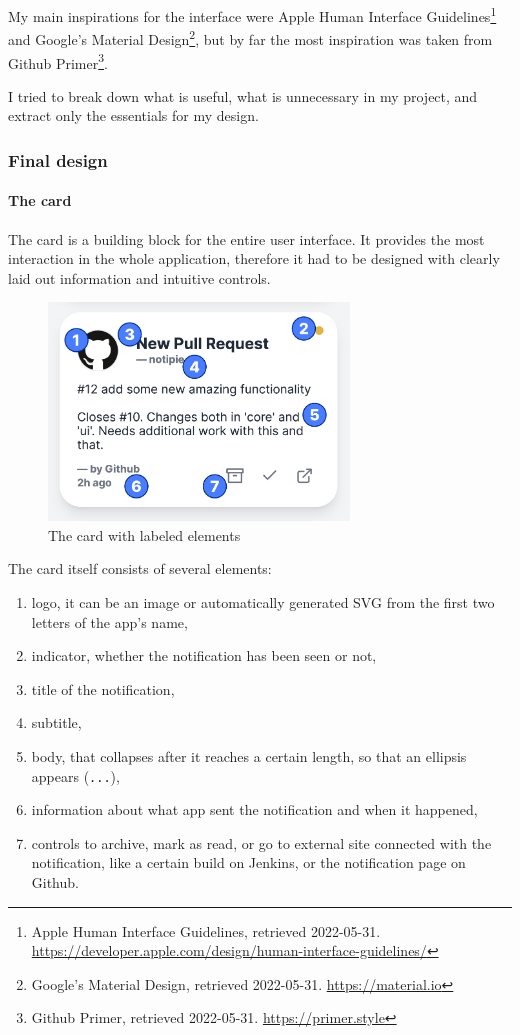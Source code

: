 My main inspirations for the interface were Apple Human Interface
Guidelines\footnote{Apple Human Interface Guidelines, retrieved
2022-05-31.
\url{https://developer.apple.com/design/human-interface-guidelines/}}
and Google's Material Design\footnote{Google's Material Design,
retrieved 2022-05-31. \url{https://material.io}}, but by far the most
inspiration was taken from Github Primer\footnote{Github Primer,
retrieved 2022-05-31. \url{https://primer.style}}.

I tried to break down what is useful, what is unnecessary in my project,
and extract only the essentials for my design.

\subsubsection{Final design}\label{final-design}

\paragraph{The card}\label{the-card}

The card is a building block for the entire user interface. It provides
the most interaction in the whole application, therefore it had to be
designed with clearly laid out information and intuitive controls.

\begin{figure}
  \centering
  \includegraphics[width=8cm,keepaspectratio]{./img/card_labeled.png}
  \caption{The card with labeled elements}
\end{figure}

The card itself consists of several elements:

\begin{enumerate}
  \item
    logo, it can be an image or automatically generated SVG from the first
    two letters of the app's name,
  \item
    indicator, whether the notification has been seen or not,
  \item
    title of the notification,
  \item
    subtitle,
  \item
    body, that collapses after it reaches a certain length, so that an
    ellipsis appears (\texttt{...}),
  \item
    information about what app sent the notification and when it happened,
  \item
    controls to archive, mark as read, or go to external site connected
    with the notification, like a certain build on Jenkins, or the
    notification page on Github.
\end{enumerate}

